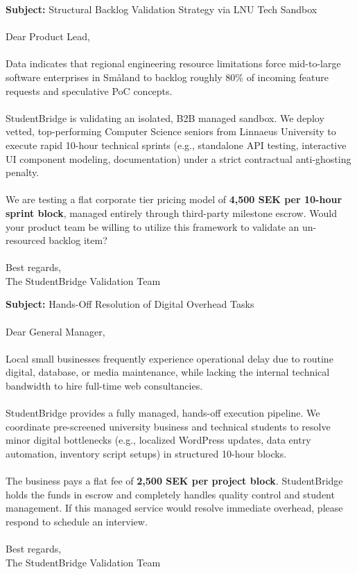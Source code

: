 \documentclass[12pt,a4paper]{article}
\begin{document}
\begin{tcolorbox}[title=Template A: Enterprise R\&D Sandbox Testing (Sent to 20 IT Firms), colback=white, colframe=black, arc=0mm]
\small
\textbf{Subject:} Structural Backlog Validation Strategy via LNU Tech Sandbox\\
\\
Dear Product Lead, \\
\\
Data indicates that regional engineering resource limitations force mid-to-large software enterprises in Småland to backlog roughly 80\% of incoming feature requests and speculative PoC concepts. \\
\\
StudentBridge is validating an isolated, B2B managed sandbox. We deploy vetted, top-performing Computer Science seniors from Linnaeus University to execute rapid 10-hour technical sprints (e.g., standalone API testing, interactive UI component modeling, documentation) under a strict contractual anti-ghosting penalty. \\
\\
We are testing a flat corporate tier pricing model of \textbf{4,500 SEK per 10-hour sprint block}, managed entirely through third-party milestone escrow. Would your product team be willing to utilize this framework to validate an un-resourced backlog item? \\
\\
Best regards,\\
The StudentBridge Validation Team
\end{tcolorbox}

\begin{tcolorbox}[title=Template B: SME Digital Operations Testing (Sent to 20 Non-Technical Businesses), colback=white, colframe=black, arc=0mm]
\small
\textbf{Subject:} Hands-Off Resolution of Digital Overhead Tasks\\
\\
Dear General Manager, \\
\\
Local small businesses frequently experience operational delay due to routine digital, database, or media maintenance, while lacking the internal technical bandwidth to hire full-time web consultancies. \\
\\
StudentBridge provides a fully managed, hands-off execution pipeline. We coordinate pre-screened university business and technical students to resolve minor digital bottlenecks (e.g., localized WordPress updates, data entry automation, inventory script setups) in structured 10-hour blocks.\\
\\
The business pays a flat fee of \textbf{2,500 SEK per project block}. StudentBridge holds the funds in escrow and completely handles quality control and student management. If this managed service would resolve immediate overhead, please respond to schedule an interview.\\
\\
Best regards,\\
The StudentBridge Validation Team
\end{tcolorbox}
\end{document}
